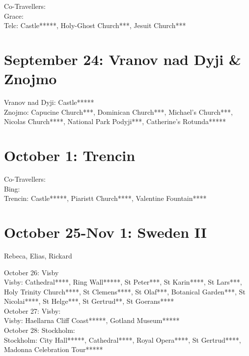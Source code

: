 Co-Travellers:\\
Grace:\\

Telc: Castle*****, Holy-Ghost Church***, Jesuit Church***\\


\section{September 24: Vranov nad Dyji \& Znojmo}
\label{2023:Vranov}


Vranov nad Dyji: Castle*****\\
Znojmo: Capucine Church***, Dominican Church***, Michael's Church***, Nicolas Church****, National Park Podyji***, Catherine's Rotunda*****\\

\section{October 1: Trencin}
\label{2023:Trencin}

Co-Travellers:\\
Bing:\\

Trencin: Castle*****, Piaristt Church****, Valentine Fountain****\\

\section{October 25-Nov 1: Sweden II}
\label{2023:SwedenII}

Rebeca, Elias, Rickard

October 26: Visby\\

Visby: Cathedral****, Ring Wall*****, St Peter***, St Karin****, St Lars***,  Holy Trinity Church****, St Clemens****, St Olaf***, Botanical Garden***, St Nicolai****, St Helge***, St Gertrud**, St Goerans****\\

October 27: Visby:\\

Visby: Haellarna Cliff Coast*****, Gotland Museum*****\\

October 28: Stockholm:\\

Stockholm: City Hall*****, Cathedral****, Royal Opera****, St Gertrud****, Madonna Celebration Tour*****\\

